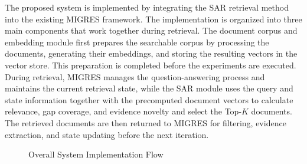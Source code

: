 \documentclass[12pt,a4paper]{report}
\begin{document}
The proposed system is implemented by integrating the SAR retrieval method into the existing MIGRES framework. The implementation is organized into three main components that work together during retrieval. The document corpus and embedding module first prepares the searchable corpus by processing the documents, generating their embeddings, and storing the resulting vectors in the vector store. This preparation is completed before the experiments are executed. During retrieval, MIGRES manages the question-answering process and maintains the current retrieval state, while the SAR module uses the query and state information together with the precomputed document vectors to calculate relevance, gap coverage, and evidence novelty and select the Top-$K$ documents. The retrieved documents are then returned to MIGRES for filtering, evidence extraction, and state updating before the next iteration.
\begin{figure}[H]
\centering
{}
\caption{Overall System Implementation Flow}
\label{fig:system-implementation}
\end{figure}
\end{document}
